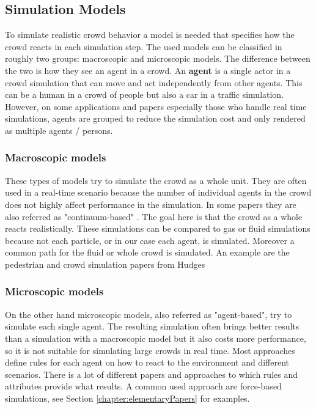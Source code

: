 \documentclass{acmsiggraph}               %
\begin{document}
\subsection{Simulation Models}
\label{chap:simulationModels}
To simulate realistic crowd behavior a model is needed that specifies how the crowd reacts in each simulation step. The used models can be classified in roughly two groups: macroscopic and microscopic models. The difference between the two is how they see an agent in a crowd. An \textbf{agent} is a single actor in a crowd simulation that can move and act independently from other agents. This can be a human in a crowd of people but also a car in a traffic simulation. However, on some applications and papers especially those who handle real time simulations, agents are grouped to reduce the simulation cost and only rendered as multiple agents / persons.

\subsubsection{\textbf{Macroscopic models}}
These types of models try to simulate the crowd as a whole unit. They are often used in a real-time scenario because the number of individual agents in the crowd does not highly affect performance in the simulation. In some papers they are also referred as "continuum-based" \cite{xu_crowd_2014}. The goal here is that the crowd as a whole reacts realistically. These simulations can be compared to gas or fluid simulations because not each particle, or in our case each agent, is simulated. Moreover a common path for the fluid or whole crowd is simulated. An example are the pedestrian and crowd simulation papers from Hudges \cite{hughes_continuum_2002} \cite{hughes_flow_2003}

\subsubsection{\textbf{Microscopic models}} \label{def:microscopic models}
On the other hand microscopic models, also referred as "agent-based"\cite{xu_crowd_2014}, try to simulate each single agent. The resulting simulation often brings better results than a simulation with a macroscopic model but it also costs more performance, so it is not suitable for simulating large crowds in real time. Most approaches define rules for each agent on how to react to the environment and different scenarios. There is a lot of different papers and approaches to which rules and attributes provide what results. A common used approach are force-based simulations, see Section \ref{chapter:elementaryPapers} for examples.
\end{document}
